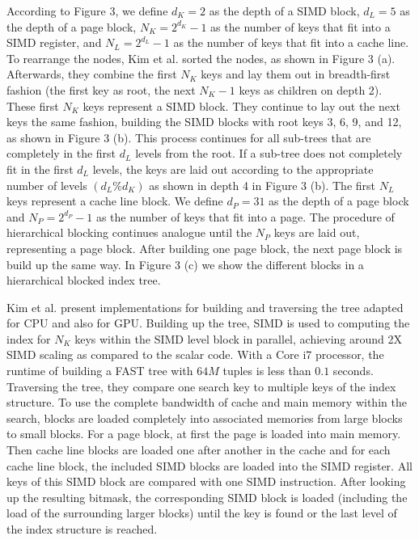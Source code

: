 \documentclass[runningheads,a4paper]{llncs}
\begin{document}
According to Figure 3, we define $d_K=2$ as the depth of a SIMD block, $d_L=5$ as the depth of a page block, $N_K=2^{d_K} -1$ as the number of keys that fit into a SIMD register, and $N_L = 2^{d_L} - 1$ as the number of keys that fit into a cache line. To rearrange the nodes, Kim et al. sorted the nodes, as shown in Figure 3 (a). Afterwards, they combine the first $N_K$ keys and lay them out in breadth-first fashion (the first key as root, the next $N_K - 1$ keys as children on depth 2). These first $N_K$ keys represent a SIMD block. They continue to lay out the next keys the same fashion, building the SIMD blocks with root keys 3, 6, 9, and 12, as shown in Figure 3 (b). This process continues for all sub-trees that are completely in the first $d_L$ levels from the root. If a sub-tree does not completely fit in the first $d_L$ levels, the keys are laid out according to the appropriate number of levels $(d_L \% d_K)$ as shown in depth 4 in Figure 3 (b). The first $N_L$ keys represent a cache line block. We define $d_P=31$ as the depth of a page block and $N_P=2^{d_P} -1$ as the number of keys that fit into a page. The procedure of hierarchical blocking continues analogue until the $N_P$ keys are laid out, representing a page block. After building one page block, the next page block is build up the same way. In Figure 3 (c) we show the different blocks in a hierarchical blocked index tree.

Kim et al. present implementations for building and traversing the tree adapted for CPU and also for GPU. Building up the tree, SIMD is used to computing the index for $N_K$ keys within the SIMD level block in parallel, achieving around 2X SIMD scaling as compared to the scalar code. With a Core i7 processor, the runtime of building a FAST tree with $64M$ tuples is less than $0.1$ seconds. Traversing the tree, they compare one search key to multiple keys of the index structure. To use the complete bandwidth of cache and main memory within the search, blocks are loaded completely into associated memories from large blocks to small blocks. For a page block, at first the page is loaded into main memory. Then cache line blocks are loaded one after another in the cache and for each cache line block, the included SIMD blocks are loaded into the SIMD register. All keys of this SIMD block are compared with one SIMD instruction. After looking up the resulting bitmask, the corresponding SIMD block is loaded (including the load of the surrounding larger blocks) until the key is found or the last level of the index structure is reached.
\end{document}

